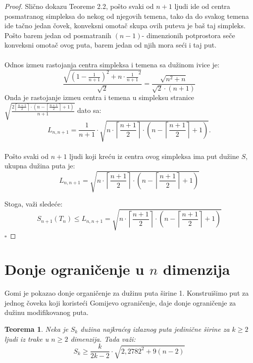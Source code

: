 \documentclass[11pt,letter]{article}
\newtheorem{teo}{\bf Teorema}[section]
\newcommand{\qed}{\hfill $\square$ \bigskip}
\begin{document}
\begin{proof}
Sli\v cno dokazu Teoreme 2.2, po\v sto svaki od $n+1$ ljudi ide od centra posmatranog simpleksa do nekog od njegovih temena, tako da do svakog temena ide ta\v cno jedan \v covek, konveksni omota\v c skupa ovih puteva je ba\v s taj simpleks. Po\v sto barem jedan od posmatranih $(n-1)$- dimenzionih potprostora se\v ce konveksni omota\v c ovog puta, barem jedan od njih mora se\' ci i taj put. 
\\
\\
\indent Odnos izme\dj u rastojanja centra simpleksa i temena sa du\v zinom ivice je:
$$\frac{\sqrt{\left( 1-\frac{1}{n+1}\right)^2+n\cdot{\frac{1}{n+1}}^2}}{\sqrt2}=\frac{\sqrt{n^2+n}}{\sqrt2 \cdot(n+1)}$$
\indent Onda je rastojanje izme\dj u centra i temena u simpleksu stranice  $\sqrt{\frac{2\left\lceil \frac{n+1}{2}\right\rceil\cdot \left( n-\left\lceil\frac{n+1}{2}\right\rceil+1\right)}{n+1}}$ dato sa:
\\
$$L_{n,n+1}=\frac{1}{n+1}\cdot\sqrt{n\cdot\left\lceil\frac{n+1}{2}\right\rceil\cdot\left( n-\left\lceil\frac{n+1}{2}\right\rceil+1\right)}.$$
\\
\indent Po\v sto svaki od $n+1$ ljudi koji kre\' cu iz centra ovog simpleksa ima put du\v zine $S$, ukupna du\v zina puta je:
\\
$$L_{n,n+1}=\sqrt{n\cdot\left\lceil\frac{n+1}{2}\right\rceil\cdot\left( n-\left\lceil\frac{n+1}{2}\right\rceil +1\right)}$$

\indent Stoga, va\v zi slede\' ce:
$$S_{n+1}(T_n)\leqslant L_{n,n+1}= \sqrt{n\cdot\left\lceil\frac{n+1}{2}\right\rceil\cdot\left( n-\left\lceil\frac{n+1}{2}\right\rceil +1\right)}$$
\qed
\end{proof}

\section{Donje ograni\v cenje u $n$ dimenzija}
\bigskip
Gomi \cite{Ghomi} je pokazao donje organi\v cenje za du\v zinu puta \v sirine 1. Konstrui\v simo put za jednog \v coveka koji koriste\' ci Gomijevo ograni\v cenje, daje donje ograni\v cenje za du\v zinu modifikovanog puta.

\begin{teo}
Neka je $S_k$ du\v zina najkra\' ceg izlaznog puta jedini\v cne \v sirine za $k\geqslant 2$ ljudi iz trake u $n\geqslant 2$ dimenzija. Tada va\v zi:
$$S_k\geqslant\frac{k}{2k-2}\cdot \sqrt{2,2782^2+9(n-2)}$$
\end{teo}
\end{document}
